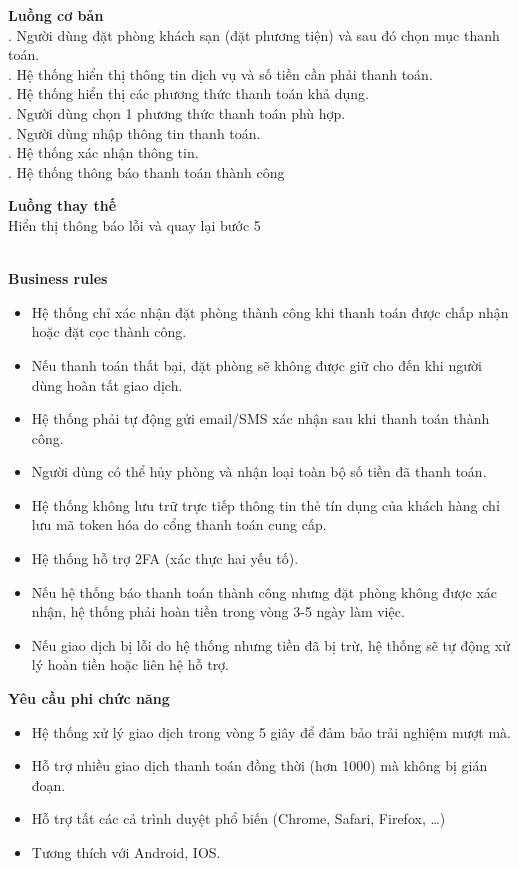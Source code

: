 \begin{small}
\textbf{Luồng cơ bản}\\
. Người dùng đặt phòng khách sạn (đặt phương tiện) và sau đó chọn mục thanh toán.\\
. Hệ thống hiển thị thông tin dịch vụ và số tiền cần phải thanh toán.\\
. Hệ thống hiển thị các phương thức thanh toán khả dụng.\\
. Người dùng chọn 1 phương thức thanh toán phù hợp.\\
. Người dùng nhập thông tin thanh toán.\\
. Hệ thống xác nhận thông tin.\\
. Hệ thống thông báo thanh toán thành công

\textbf{Luồng thay thế}\\
 Hiển thị thông báo lỗi và quay lại bước 5\\
\end{small}\\
\textbf{\indent Business rules}
\begin{itemize}
    \item Hệ thống chỉ xác nhận đặt phòng thành công khi thanh toán được chấp nhận hoặc đặt cọc thành công.
    \item Nếu thanh toán thất bại, đặt phòng sẽ không được giữ cho đến khi người dùng hoàn tất giao dịch.
    \item Hệ thống phải tự động gửi email/SMS xác nhận sau khi thanh toán thành công.
    \item Người dùng có thể hủy phòng và nhận loại toàn bộ số tiền đã thanh toán.
    \item Hệ thống không lưu trữ trực tiếp thông tin thẻ tín dụng của khách hàng chỉ lưu mã token hóa do cổng thanh toán cung cấp.
    \item Hệ thống hỗ trợ 2FA (xác thực hai yếu tố).
    \item Nếu hệ thống báo thanh toán thành công nhưng đặt phòng không được xác nhận, hệ thống phải hoàn tiền trong vòng 3-5 ngày làm việc.
    \item Nếu giao dịch bị lỗi do hệ thống nhưng tiền đã bị trừ, hệ thống sẽ tự động xử lý hoàn tiền hoặc liên hệ hỗ trợ.
\end{itemize}

\textbf{Yêu cầu phi chức năng}
\begin{itemize}
    \item Hệ thống xử lý giao dịch trong vòng 5 giây để đảm bảo trải nghiệm mượt mà.
    \item Hỗ trợ nhiều giao dịch thanh toán đồng thời (hơn 1000) mà không bị gián đoạn.
    \item Hỗ trợ tất các cả trình duyệt phổ biến (Chrome, Safari, Firefox, …)
    \item Tương thích với Android, IOS.
\end{itemize}

